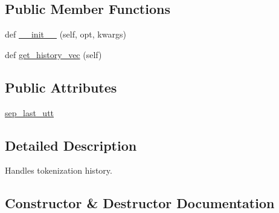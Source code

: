 \subsection*{Public Member Functions}
\begin{DoxyCompactItemize}
\item 
def \hyperlink{classparlai_1_1agents_1_1bert__classifier_1_1bert__classifier_1_1BertClassifierHistory_ae42446cb8bcb68591503e41ed7744666}{\+\_\+\+\_\+init\+\_\+\+\_\+} (self, opt, kwargs)
\item 
def \hyperlink{classparlai_1_1agents_1_1bert__classifier_1_1bert__classifier_1_1BertClassifierHistory_ac5a9d856cbb3e3994e6c99dbb1578b13}{get\+\_\+history\+\_\+vec} (self)
\end{DoxyCompactItemize}
\subsection*{Public Attributes}
\begin{DoxyCompactItemize}
\item 
\hyperlink{classparlai_1_1agents_1_1bert__classifier_1_1bert__classifier_1_1BertClassifierHistory_ab53ecd52f1f23b1ea488637cc8fd8068}{sep\+\_\+last\+\_\+utt}
\end{DoxyCompactItemize}


\subsection{Detailed Description}
\begin{DoxyVerb}Handles tokenization history.
\end{DoxyVerb}
 

\subsection{Constructor \& Destructor Documentation}
\mbox{\label{classparlai_1_1agents_1_1bert__classifier_1_1bert__classifier_1_1BertClassifierHistory_ae42446cb8bcb68591503e41ed7744666}} 
